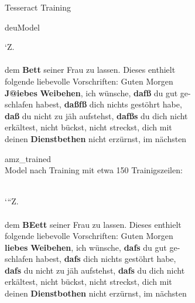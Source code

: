 \documentclass{beamer}
\begin{document}
\begin{frame}{Tesseract Training}
	\fontsize{9pt}{10pt}\selectfont
	\begin{block}{\glqq deu\grqq Model}
			\begin{minipage}[t]{0.9\textwidth}
			‘Z.  \\                                             
			~\\   
			dem\textbf{ Bett }seiner Frau zu lassen. Dieses enthielt   \\
			folgende liebevolle Vorschriften: Guten Morgen    \\
			\textbf{J@iebes} \textbf{Weibehen}, ich wünsche, \textbf{dafß }du gut ge-    \\
			schlafen habest,\textbf{ daßfß} dich nichts gestöhrt habe, \\
			\textbf{daß} du nicht zu jäh aufstehst, \textbf{dafßs }du dich nicht\\
			erkältest, nicht bückst, nicht streckst, dich mit \\
			deinen\textbf{ Dienstbethen} nicht erzürnst, im nächsten   
		\end{minipage}
	\end{block}

	\begin{block}{\glqq amz\_trained\grqq\\Model  }
		nach Training mit etwa 150 Trainigszeilen:\\
		~\\
	\begin{minipage}[t]{0.9\textwidth}
		‘“Z.       \\                                       
		~\\ 
		dem \textbf{BEett} seiner Frau zu lassen. Dieses enthielt  \\
		folgende liebevolle Vorschriften: Guten Morgen    \\
		\textbf{liebes}\textbf{ Weibehen}, ich wünsche, \textbf{dafs} du gut ge-     \\
		schlafen habest,\textbf{ dafs} dich nichts gestöhrt habe,  \\
		\textbf{dafs} du nicht zu jäh aufstehst, \textbf{dafs} du dich nicht\\
		erkältest, nicht bückst, nicht streckst, dich mit \\
		deinen \textbf{Dienstbothen} nicht erzürnst, im nächsten 
	\end{minipage}
	\end{block}
\end{frame}
\end{document}
